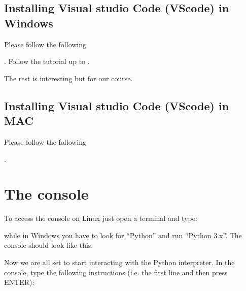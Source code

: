 \documentclass[letterpaper,10pt,english]{sphinxmanual}
\let\sphinxpxdimen\pdfpxdimen\else\newdimen\sphinxpxdimen
\begin{document}
\subsection{Installing Visual studio Code (VScode) in Windows}
\label{\detokenize{M1_practical1:Installing-Visual-studio-Code-(VScode)-in-Windows}}
\begin{DUlineblock}{0em}
\item[] Please follow the following %
\begin{footnote}[3]\sphinxAtStartFootnote
{}
%
\end{footnote}. Follow the tutorial up to .
\item[] The rest is interesting but  for our course.
\end{DUlineblock}


\subsection{Installing Visual studio Code (VScode) in MAC}
\label{\detokenize{M1_practical1:Installing-Visual-studio-Code-(VScode)-in-MAC}}
\sphinxAtStartPar
Please follow the following %
\begin{footnote}[4]\sphinxAtStartFootnote
{}
%
\end{footnote}.


\section{The console}
\label{\detokenize{M1_practical1:The-console}}
\sphinxAtStartPar
To access the console on Linux just open a terminal and type:

\sphinxAtStartPar
{}

\sphinxAtStartPar
while in Windows you have to look for “Python” and run “Python 3.x”. The console should look like this:

\noindent\sphinxincludegraphics[width=591\sphinxpxdimen,height=360\sphinxpxdimen]{{pythonconsole}.png}

\sphinxAtStartPar
Now we are all set to start interacting with the Python interpreter. In the console, type the following instructions (i.e. the first line and then press ENTER):
\end{document}
